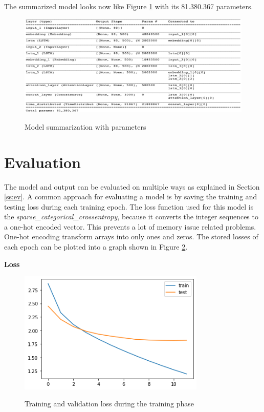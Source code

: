 The summarized model looks now like Figure \ref{model_sum} with its 81.380.367 parameters.

\begin{figure}
	\begin{center}
		\includegraphics[width=6in]{photos/model_sum}\\
		\caption{Model summarization with parameters}\label{model_sum}
	\end{center}
\end{figure}

\section{Evaluation}\label{ss:eval}

The model and output can be evaluated on multiple ways as explained in Section \ref{ss:ev}. A common approach for evaluating a model is by saving the training and testing loss during each training epoch. The loss function used for this model is the \textit{sparse\_categorical\_crossentropy}, because it converts the integer sequences to a one-hot encoded vector. This prevents a lot of memory issue related problems. One-hot encoding transform arrays into only ones and zeros. The stored losses of each epoch can be plotted into a graph shown in Figure \ref{eval}.

\textbf{Loss}

\begin{figure}
	\begin{center}
		\includegraphics[width=3.5in]{photos/eval}\\
		\caption{Training and validation loss during the training phase}\label{eval}
	\end{center}
\end{figure}

